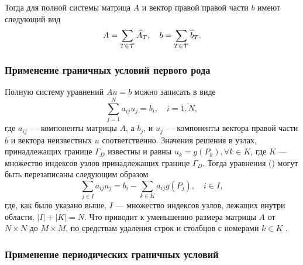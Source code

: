 \documentclass[12pt, a4paper]{article}
\newcommand\Tau{\scalerel*{\tau}{T}}
\begin{document}
				Тогда для полной системы матрица $A$ и вектор правой правой части $b$ имеют следующий вид
				\begin{equation*}
					A = \sum_{T \in \Tau} \widehat{A}_T, \quad 
					b = \sum_{T \in \Tau} \widehat{b}_T.
				\end{equation*}
				
			\subsubsection{Применение граничных условий первого рода}
			
				Полную систему уравнений $A u = b$ можно записать в виде 
				\begin{equation}
					\sum_{j = 1}^{N} a_{ij} u_{j} = b_i, \quad i = \overline{1,N},
					\label{sys_in_index}
				\end{equation}
				где $a_{ij}$ --- компоненты матрицы $A$, а $b_{j}$, и $u_{j}$ --- компоненты вектора правой части $b$ и вектора неизвестных $u$ соответственно. Значения решения в узлах, принадлежащих границе $\Gamma_D$ известны и равны $u_k = g(P_k), \forall k \in K$, где $K$ --- множество индексов узлов принадлежащих границе $\Gamma_D$. Тогда уравнения () могут быть перезаписаны следующим образом
				\begin{equation}
					\sum_{j \in I} a_{ij} u_{j} = 
					b_i - \sum_{k \in K} a_{ij} g(P_j), 
					\quad i \in I,
					\label{sys_in_index_plus_dirichlet}
				\end{equation}
				где, как было указано выше, $I$ --- множество индексов узлов, лежащих внутри области, $|I| + |K| = N$. Что приводит к уменьшению размера  матрицы $A$ от $N \times N$ до $M \times M$, по средствам удаления строк и столбцов с номерами $k \in K$ \cite{Galanin}.
				
			\subsubsection{Применение периодических граничных условий}
				
\end{document}
